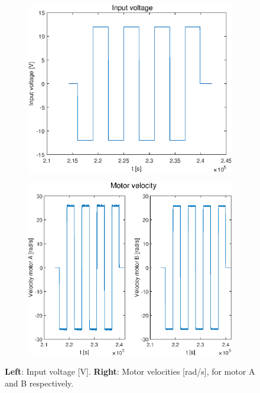 \documentclass[a4paper,kul]{kulakarticle} %
\begin{document}
\begin{figure}[htp!]
	\centering
	\begin{subfigure}[b]{0.485\textwidth}
		\centering
		\includegraphics[width=\textwidth]{input_voltage.eps}
	\end{subfigure}
	\hfill
	\begin{subfigure}[b]{0.5\textwidth}  
		\centering 
		\includegraphics[width=\textwidth]{motor_velocity.eps}
	\end{subfigure}
	\caption[Input voltage \& Motor velocity]{\textbf{Left}: Input voltage [V]. \textbf{Right}: Motor velocities [rad/s], for motor A and B respectively.} 
	\label{fig:IO}
\end{figure}
\end{document}
